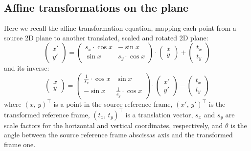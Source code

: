 \subsection{Affine transformations on the plane}
	\label{app.affine2d}

	Here we recall the affine transformation equation, mapping each point from a source 2D plane to another translated, scaled and rotated 2D plane: 
	\begin{equation}
		\left(\begin{array}{c}
			x' \\ y'
		\end{array}\right)
		=
		\left(\begin{array}{cc}
			s_x \cdot \cos{x} & -\sin{x} \\ \sin{x} & s_y \cdot \cos{x}
		\end{array}\right)
		\cdot
		\left(\begin{array}{c}
		x \\ y
		\end{array}\right)
		+
		\left(\begin{array}{c}
		t_x \\ t_y
		\end{array}\right)
	\end{equation}
	and its inverse:
	\begin{equation}
		\left(\begin{array}{c}
			x \\ y
		\end{array}\right)
		=
		\left(\begin{array}{cc}
			\frac{1}{s_x} \cdot \cos{x} & \sin{x} \\ -\sin{x} & \frac{1}{s_y} \cdot \cos{x}
		\end{array}\right)
		\cdot
		\left(\begin{array}{c}
			x' \\ y'
		\end{array}\right)
		-
		\left(\begin{array}{c}
			t_x \\ t_y
		\end{array}\right)
	\end{equation}
	where $(x,\,y)^\top$ is a point in the source reference frame, $(x',\,y')^\top$ is the transformed reference frame, $(t_x,\,t_y)^\top$ is a translation vector, $s_x$ and $s_y$ are scale factors for the horizontal and vertical coordinates, respectively, and $\theta$ is the angle between the source reference frame abscissas axis and the transformed frame one. 


